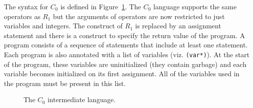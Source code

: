 \documentclass[11pt]{book}
\begin{document}
The syntax for $C_0$ is defined in Figure~\ref{fig:c0-syntax}.  The
$C_0$ language supports the same operators as $R_1$ but the arguments
of operators are now restricted to just variables and integers. The
 construct of $R_1$ is replaced by an assignment statement
and there is a  construct to specify the return value of
the program. A program consists of a sequence of statements that
include at least one  statement. Each program is also
annotated with a list of variables (viz. {\tt (var*)}). At the start
of the program, these variables are uninitialized (they contain garbage)
and each variable becomes initialized on its first assignment. All of
the variables used in the program must be present in this list.

\begin{figure}[tbp]
\caption{The $C_0$ intermediate language.}
\label{fig:c0-syntax}
\end{figure}
\end{document}
